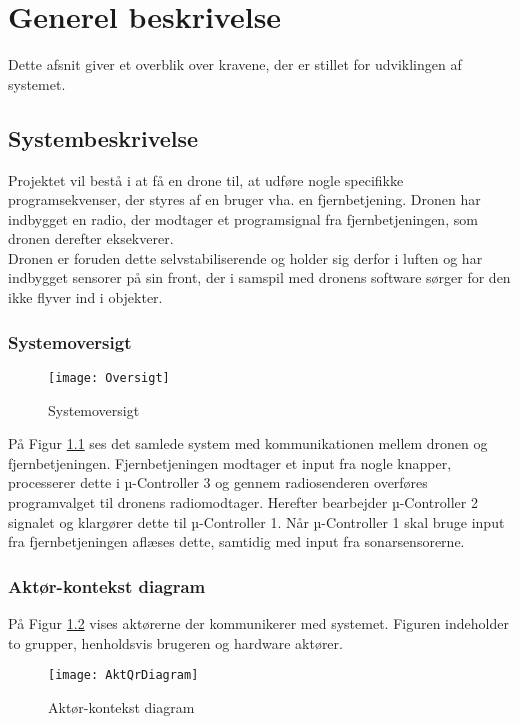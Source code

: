 \documentclass[Main]{subfiles}
\begin{document}
\chapter{Generel beskrivelse}
Dette afsnit giver et overblik over kravene, der er stillet for udviklingen af systemet.

\section{Systembeskrivelse}
Projektet vil bestå i at få en drone til, at udføre nogle specifikke programsekvenser, der styres af en bruger vha. en fjernbetjening.
Dronen har indbygget en radio, der modtager et programsignal fra fjernbetjeningen, som dronen derefter eksekverer.
\\
Dronen er foruden dette selvstabiliserende og holder sig derfor i luften og har indbygget sensorer på sin front, der i samspil med dronens software sørger for den ikke flyver ind i objekter.


\subsection{Systemoversigt}

\begin{figure}[H]
\centering
\texttt{[image: Oversigt]}
\caption{Systemoversigt}
\label{Fig:Oversigt}
\end{figure}

På Figur \ref{Fig:Oversigt} ses det samlede system med kommunikationen mellem dronen og fjernbetjeningen.
Fjernbetjeningen modtager et input fra nogle knapper, processerer dette i µ-Controller 3 og gennem radiosenderen overføres programvalget til dronens radiomodtager.
Herefter bearbejder µ-Controller 2 signalet og klargører dette til µ-Controller 1.
Når µ-Controller 1 skal bruge input fra fjernbetjeningen aflæses dette, samtidig med input fra sonarsensorerne.



\subsection{Aktør-kontekst diagram}

På Figur \ref{Fig:Aktor-oversigt} vises aktørerne der kommunikerer med systemet.
Figuren indeholder to grupper, henholdsvis brugeren og hardware aktører.


\begin{figure}[H]
\centering
\texttt{[image: AktQrDiagram]}
\caption{Aktør-kontekst diagram}
\label{Fig:Aktor-oversigt}
\end{figure}
\end{document}
